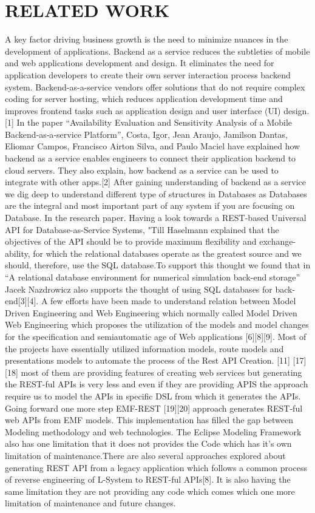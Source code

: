 \documentclass[letterpaper, 10 pt, conference]{ieeeconf}
\begin{document}
\section{RELATED WORK}
A key factor driving business growth is the need to minimize nuances in the development of applications. Backend as a service reduces the subtleties of mobile and web applications development and design. It eliminates the need for application developers to create their own server interaction process backend system. Backend-as-a-service vendors offer solutions that do not require complex coding for server hosting, which reduces application development time and improves frontend tasks such as application design and user interface (UI) design.[1] In the paper “Availability Evaluation and Sensitivity Analysis of a Mobile Backend‐as‐a‐service Platform”, Costa, Igor, Jean Araujo, Jamilson Dantas, Eliomar Campos, Francisco Airton Silva, and Paulo Maciel have explained how backend as a service enables engineers to connect their application backend to cloud servers. They also explain, how backend as a service can be used to integrate with other apps.[2]
After gaining understanding of backend as a service we dig deep to understand different type of structures in Databases as Databases are the integral and most important part of any system if you are focusing on Database. In the research paper. Having a look towards a REST-based Universal API for Database-as-Service Systems, "Till Haselmann explained that the objectives of the API should be to provide maximum flexibility and exchange-ability, for which the relational databases operate as the greatest source and we should, therefore, use the SQL database.To support this thought we found that in “A relational database environment for numerical simulation back-end storage” Jacek Nazdrowicz also supports the thought of using SQL databases for back-end[3][4].
A few eﬀorts have been made to understand relation between Model Driven Engineering and Web Engineering which normally called Model Driven Web Engineering which proposes the utilization of the models and model changes for the speciﬁcation and semiautomatic age of Web applications [6][8][9]. Most of the projects have essentially utilized information models, route models and presentations models to automate the process of the Rest API Creation. [11] [17] [18] most of them are providing features of creating web services but generating the REST-ful APIs is very less and even if they are providing APIS the approach require us to model the APIs in specific DSL from which it generates the APIs. Going forward one more step EMF-REST [19][20] approach generates REST-ful web APIs from EMF models. This implementation has filled the gap between Modeling methodology and web technologies. The Eclipse Modeling Framework also has one limitation that it does not provides the Code which has it’s own limitation of maintenance.There are also several approaches explored about generating REST API from a legacy application which follows a common process of reverse engineering of L-System to REST-ful APIs[8]. It is also having the same limitation they are not providing any code which comes which one more limitation of maintenance and future changes.
\end{document}
